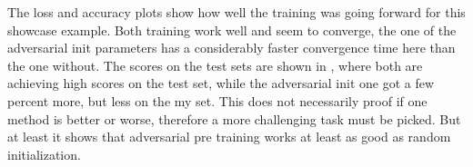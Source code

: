The loss and accuracy plots show how well the training was going forward for this showcase example. Both training work well and seem to converge, the one of the adversarial init parameters has a considerably faster convergence time here than the one without.
The scores on the test sets are shown in , where both are achieving high scores on the test set, while the adversarial init one got a few percent more, but less on the my set.
This does not necessarily proof if one method is better or worse, therefore a more challenging task must be picked.
But at least it shows that adversarial pre training works at least as good as random initialization.

